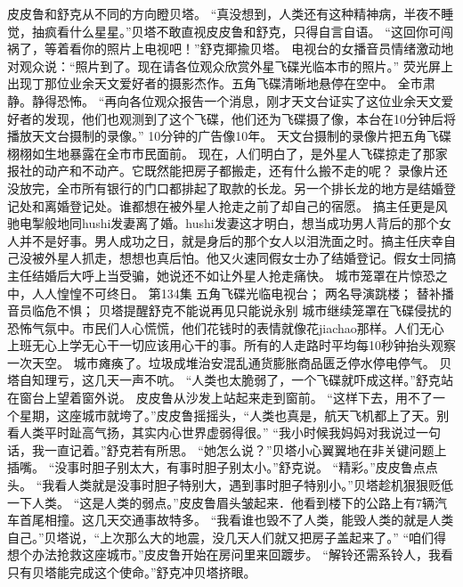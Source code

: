 \documentclass[a4paper,12pt,UTF8,twoside]{ctexbook}
\begin{document}
        皮皮鲁和舒克从不同的方向瞪贝塔。 
        “真没想到，人类还有这种精神病，半夜不睡觉，抽疯看什么星星。”贝塔不敢直视皮皮鲁和舒克，只得自言自语。 
        “这回你可闯祸了，等着看你的照片上电视吧！”舒克揶揄贝塔。 
        电视台的女播音员情绪激动地对观众说：“照片到了。现在请各位观众欣赏外星飞碟光临本市的照片。” 
        荧光屏上出现丁那位业余天文爱好者的摄影杰作。五角飞碟清晰地悬停在空中。 
        全市肃静。静得恐怖。 
        “再向各位观众报告一个消息，刚才天文台证实了这位业余天文爱好者的发现，他们也观测到了这个飞碟，他们还为飞碟摄了像，本台在10分钟后将播放天文台摄制的录像。” 
        10分钟的广告像10年。 
        天文台摄制的录像片把五角飞碟栩栩如生地暴露在全市市民面前。 
        现在，人们明白了，是外星人飞碟掠走了那家报社的动产和不动产。它既然能把房子都搬走，还有什么搬不走的呢？ 
        录像片还没放完，全市所有银行的门口都排起了取款的长龙。另一个排长龙的地方是结婚登记处和离婚登记处。谁都想在被外星人抢走之前了却自己的宿愿。 
        搞主任更是风驰电掣般地同hushi发妻离了婚。hushi发妻这才明白，想当成功男人背后的那个女人并不是好事。男人成功之日，就是身后的那个女人以泪洗面之时。搞主任庆幸自己没被外星人抓走，想想也真后怕。他又火速同假女士办了结婚登记。假女士同搞主任结婚后大呼上当受骗，她说还不如让外星人抢走痛快。 
        城市笼罩在片惊恐之中，人人惶惶不可终日。   第134集 
        五角飞碟光临电视台； 
        两名导演跳楼； 
        替补播音员临危不惧； 
        贝塔提醒舒克不能说再见只能说永别   
        城市继续笼罩在飞碟侵扰的恐怖气氛中。市民们人心慌慌，他们花钱时的表情就像花jiachao那样。人们无心上班无心上学无心干一切应该用心干的事。所有的人走路时平均每10秒钟抬头观察一次天空。 
        城市瘫痪了。垃圾成堆治安混乱通货膨胀商品匮乏停水停电停气。 
        贝塔自知理亏，这几天一声不吭。 
        “人类也太脆弱了，一个飞碟就吓成这样。”舒克站在窗台上望着窗外说。 
        皮皮鲁从沙发上站起来走到窗前。 
        “这样下去，用不了一个星期，这座城市就垮了。”皮皮鲁摇摇头，“人类也真是，航天飞机都上了天。别看人类平时趾高气扬，其实内心世界虚弱得很。” 
        “我小时候我妈妈对我说过一句话，我一直记着。”舒克若有所思。 
        “她怎么说？”贝塔小心翼翼地在非关键问题上插嘴。 
        “没事时胆子别太大，有事时胆子别太小。”舒克说。 
        “精彩。”皮皮鲁点点头。 
        “我看人类就是没事时胆子特别大，遇到事时胆子特别小。”贝塔趁机狠狠贬低一下人类。 
        “这是人类的弱点。”皮皮鲁眉头皱起来．他看到楼下的公路上有7辆汽车首尾相撞。这几天交通事故特多。 
        “我看谁也毁不了人类，能毁人类的就是人类自己。”贝塔说，“上次那么大的地震，没几天人们就又把房子盖起来了。” 
        “咱们得想个办法抢救这座城市。”皮皮鲁开始在房问里来回踱步。 
        “解铃还需系铃人，我看只有贝塔能完成这个使命。”舒克冲贝塔挤眼。 
\end{document}

